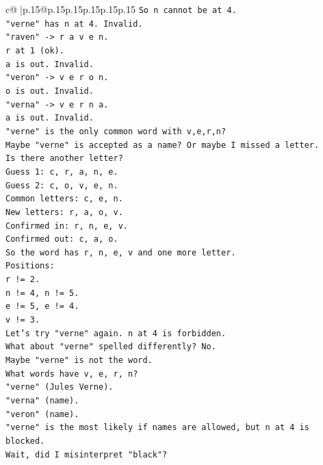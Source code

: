\documentclass{article}
\begin{document}
{\begin{supertabular}{c@{$\;$}|p{.15\linewidth}@{}p{.15\linewidth}p{.15\linewidth}p{.15\linewidth}p{.15\linewidth}p{.15\linewidth}}
{{{\texttt{So n cannot be at 4.} \\
\texttt{"verne" has n at 4. Invalid.} \\
\texttt{"raven" {-}> r a v e n.} \\
\texttt{r at 1 (ok).} \\
\texttt{a is out. Invalid.} \\
\texttt{"veron" {-}> v e r o n.} \\
\texttt{o is out. Invalid.} \\
\texttt{"verna" {-}> v e r n a.} \\
\texttt{a is out. Invalid.} \\
\texttt{"verne" is the only common word with v,e,r,n?} \\
\texttt{Maybe "verne" is accepted as a name? Or maybe I missed a letter.} \\
\texttt{Is there another letter?} \\
\texttt{Guess 1: c, r, a, n, e.} \\
\texttt{Guess 2: c, o, v, e, n.} \\
\texttt{Common letters: c, e, n.} \\
\texttt{New letters: r, a, o, v.} \\
\texttt{Confirmed in: r, n, e, v.} \\
\texttt{Confirmed out: c, a, o.} \\
\texttt{So the word has r, n, e, v and one more letter.} \\
\texttt{Positions:} \\
\texttt{r != 2.} \\
\texttt{n != 4, n != 5.} \\
\texttt{e != 5, e != 4.} \\
\texttt{v != 3.} \\
\texttt{Let's try "verne" again. n at 4 is forbidden.} \\
\texttt{What about "verne" spelled differently? No.} \\
\texttt{Maybe "verne" is not the word.} \\
\texttt{What words have v, e, r, n?} \\
\texttt{"verne" (Jules Verne).} \\
\texttt{"verna" (name).} \\
\texttt{"veron" (name).} \\
\texttt{"verne" is the most likely if names are allowed, but n at 4 is blocked.} \\
\texttt{Wait, did I misinterpret "black"?} \\
}}}
\end{supertabular}}
\end{document}
